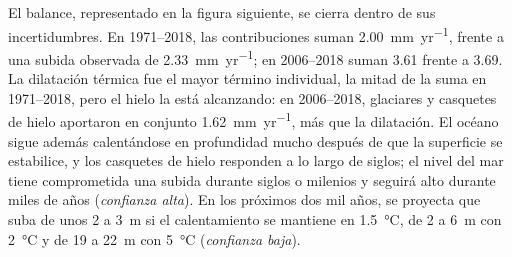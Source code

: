 El balance, representado en la figura siguiente, se cierra dentro de sus incertidumbres. En 1971--2018, las contribuciones suman
\qty{2.00}{mm.yr^{-1}}, frente a una subida observada de \qty{2.33}{mm.yr^{-1}}; en 2006--2018
suman 3.61 frente a 3.69. La dilatación térmica fue el mayor término individual, la mitad de la suma en 1971--2018, pero el hielo
la está alcanzando: en 2006--2018, glaciares y casquetes de hielo aportaron en conjunto \qty{1.62}{mm.yr^{-1}}, más que
la dilatación. El océano sigue además calentándose en profundidad mucho después de que la superficie se estabilice, y los casquetes
de hielo responden a lo largo de siglos; el nivel del mar tiene comprometida una subida durante siglos o milenios y
seguirá alto durante miles de años (\emph{confianza alta}). En los próximos dos mil años, se
proyecta que suba de unos 2 a \qty{3}{m} si el calentamiento se mantiene en \qty{1.5}{\celsius}, de 2 a
\qty{6}{m} con \qty{2}{\celsius} y de 19 a \qty{22}{m} con \qty{5}{\celsius} (\emph{confianza baja}).

